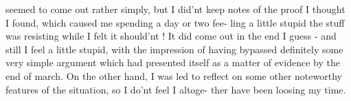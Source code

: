 seemed to come out rather simply,  but I did'nt keep notes of the
proof I thought I found,  which caused me spending  a day or two fee-%
ling a little stupid\hand{,}  the stuff was resisting while I felt it
should'nt !  It did come out in the end I guess -  and still I feel a
little stupid, with the impression of having bypassed definitely some
very simple argument which had presented itself as a matter of evidence
by the end of march.  On the other hand,  I was led to reflect on some
other noteworthy features of the situation,  so I do'nt feel I altoge-%
ther have been loosing my time.

